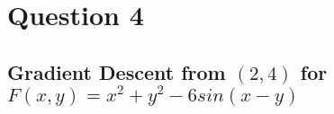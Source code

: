 \section{Question 4}
% 
% 
\subsection{Gradient Descent from $(2, 4)$ for $F(x, y) = x^2 + y^2 - 6sin(x - y)$}